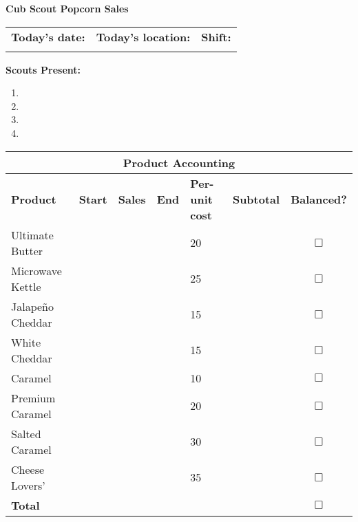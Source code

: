 \documentclass[12pt]{article}
\newcommand{\cc}[1]{\cellcolor{#1}}
\newcommand{\ccb}{\cc{blue!12}}
\newcommand{\ccy}{\cc{yellow!35}}
\newcommand{\redact}{\cc{black!50}}
\newcommand{\sep}{1mm}
\begin{document}
\thispagestyle{empty}

{\LARGE\textbf{Cub Scout Popcorn Sales}}
\medskip

\begin{tabular}{p{1.90in} | p{1.90in} | p{1.90in} }
\hline
\textbf{Today's date:} & \textbf{Today's location:} & \textbf{Shift:} \\
 & & \\
 \hline
 \end{tabular}

\bigskip
\textbf{Scouts Present:}
\begin{enumerate}
\item 
\item 
\item 
\item
\end{enumerate}

\bigskip

\begin{tabular}{| p{1.35in} | r | r | r | p{1.05in} | c | c |}
\hline
\multicolumn{7}{c}{\ccb\textbf{Product Accounting}}\\
\hline
\textbf{Product} & \textbf{Start} & \textbf{Sales} & \textbf{End} & \textbf{Per-unit cost} & \textbf{Subtotal} & \textbf{Balanced?}\\[\sep]
\hline\hline
Ultimate Butter & & & & 20 & & $\Box$ \\[\sep]
\hline
Microwave Kettle & & & & 25 & & $\Box$ \\[\sep]
\hline
Jalape\~no Cheddar & & & & 15 & & $\Box$ \\[\sep]
\hline
White Cheddar & & & & 15  & & $\Box$ \\[\sep]
\hline
Caramel & & & & 10  & & $\Box$ \\[\sep]
\hline
Premium Caramel & & & & 20  & & $\Box$ \\[\sep]
\hline
Salted Caramel & & & & 30 & & $\Box$ \\[\sep]
\hline
Cheese Lovers' & & & & 35 & & $\Box$ \\[\sep]
\hline
\ccy\textbf{Total} & \redact  & & \redact & \redact & & $\Box$ \\[\sep]
\hline
\end{tabular}

\bigskip
\end{document}
